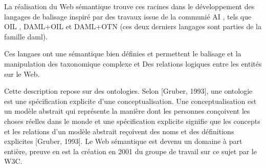	    La réalisation du Web sémantique trouve ces racines dans le développement des langages de balisage inspiré
	    par des travaux issue de la communié AI \cite{mcilraith2001semantic}, tels que 
	    \textsc{OIL} \cite{fensel2001oil}, \textsc{DAML+OIL} \cite{horrocks2002daml+oil} et \textsc{DAML+OTN} 
	    \cite{mcguinness2003daml} (ces deux derniers langages sont parties de la famille \acrshort{daml}).
	
	    Ces langaes ont une sémantique bien définies et permettent le balisage et la manipulation des taxonomique
	    complexe et Des relations logiques entre les entités sur le Web. \cite{fensel2000creating}
	    
	    
	    

	    Cette description repose sur des ontologies. Selon [Gruber, 1993], une ontologie est une spécification
	    explicite d'une conceptualisation. Une conceptualisation est un modèle abstrait qui représente la
	    manière dont les personnes conçoivent les choses réelles dans le monde et une spécification explicite
	    signifie que les concepts et les relations d'un modèle abstrait reçoivent des noms et des définitions
	    explicites [Gruber, 1993]. Le Web sémantique est devenu un domaine à part entière, preuve en est la
	    création en 2001 du groupe de travail sur ce sujet par le \textsc{W3C}.






